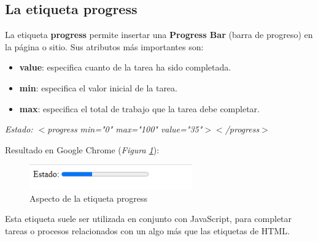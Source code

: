 \subsection{La etiqueta progress}

La etiqueta \textbf{progress} permite insertar una \textbf{Progress Bar} (barra de progreso) en la página o sitio. Sus atributos más importantes son:
\begin{itemize}
    \item \textbf{value}: especifica cuanto de la tarea ha sido completada.
    \item \textbf{min}: especifica el valor inicial de la tarea.
    \item \textbf{max}: especifica el total de trabajo que la tarea debe completar.
\end{itemize}
\begin{center}
    \textit{Estado: $<$progress min="0" max="100" value="35"$>$$<$/progress$>$}
\end{center}

Resultado en Google Chrome (\textit{Figura \ref{fig: 17}}):
\begin{figure}[H]
    \centering
    \caption{Aspecto de la etiqueta progress}
    \label{fig: 17}
    \includegraphics[width=7cm]{ss_html/progress.png}
\end{figure}

Esta etiqueta suele ser utilizada en conjunto con JavaScript, para completar tareas o procesos relacionados con un algo más que las etiquetas de HTML.